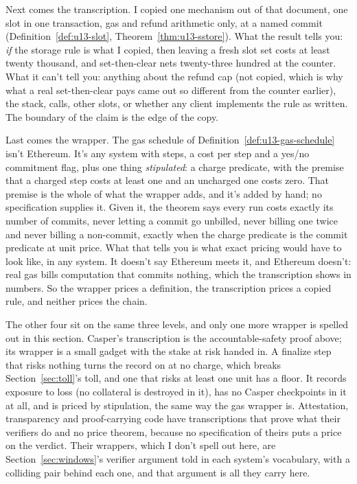 \documentclass[11pt,twoside]{article}
\theoremstyle{thielethm}
\theoremstyle{thieledef}
\theoremstyle{thieledef}
\theoremstyle{thieledef}
\theoremstyle{thielethm}
\theoremstyle{thieleobs}
\theoremstyle{thielethm}
\begin{document}
Next comes the transcription. I copied one mechanism out of that document, one slot in one transaction,
gas and refund arithmetic only, at a named commit
(Definition~\ref{def:u13-slot}, Theorem~\ref{thm:u13-sstore}). What the result tells you: \emph{if} the
storage rule is what I copied, then leaving a fresh slot set costs at least twenty thousand,
and set-then-clear nets twenty-three hundred at the counter. What it can't tell you: anything
about the refund cap (not copied, which is why what a real set-then-clear pays came out so different from the counter
earlier), the stack, calls, other slots, or whether any client implements the rule as written.
The boundary of the claim is the edge of the copy.

Last comes the wrapper. The gas schedule of Definition~\ref{def:u13-gas-schedule} isn't Ethereum. It's any
system with steps, a cost per step and a yes/no commitment flag, plus one thing \emph{stipulated}:
a charge predicate, with the premise that a charged step costs at least one and an uncharged
one costs zero. That premise is the whole of what the wrapper adds, and it's added by
hand; no specification supplies it. Given it, the theorem says every run costs exactly its number of commits, never letting a commit go unbilled, never billing one twice and never billing a non-commit, exactly when the charge predicate is the commit predicate at unit price. What that tells you is what exact pricing would have to
look like, in any system. It doesn't say Ethereum meets it, and Ethereum doesn't: real gas
bills computation that commits nothing, which the transcription shows in numbers. So the
wrapper prices a definition, the transcription prices a copied rule, and neither prices the
chain.

The other four sit on the same three levels, and only one more wrapper is spelled out in this
section. Casper's transcription is the accountable-safety proof above; its wrapper is a small
gadget with the stake at risk handed in. A finalize step that risks nothing turns the record
on at no charge, which breaks Section~\ref{sec:toll}'s toll, and one that risks at
least one unit has a floor. It records exposure to loss (no collateral is destroyed in it), has no Casper
checkpoints in it at all, and is priced by stipulation, the same way the gas wrapper is.
Attestation, transparency and proof-carrying code have transcriptions that prove what their verifiers do and no price theorem, because no specification of theirs puts a price on the verdict. Their
wrappers, which I don't spell out here, are Section~\ref{sec:windows}'s verifier argument told in each system's vocabulary,
with a colliding pair behind each one, and that argument is all they carry here.
\end{document}

